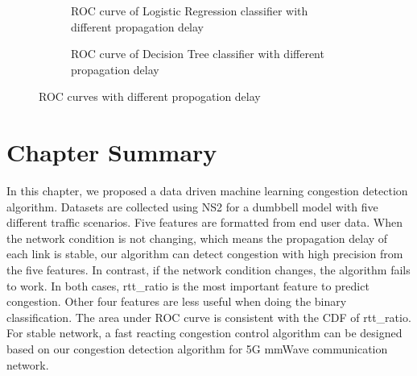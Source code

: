 \begin{figure}[!htb]\centering
\begin{subfigure}{0.49\textwidth}
\caption{ROC curve of Logistic Regression classifier with different propagation delay}
\label{LRROCDiff}
\end{subfigure}
\begin{subfigure}{0.49\textwidth}
\caption{ROC curve of Decision Tree classifier with different propagation delay}
\label{DTROCDiff}
\end{subfigure}
\caption{ROC curves with different propogation delay}
\label{fig:roc2}
\end{figure}




\section{Chapter Summary}
\label{Conclusions and Future Work}
In this chapter, we proposed a data driven machine learning congestion detection algorithm. Datasets are collected using NS2 for a dumbbell model with five different traffic scenarios. Five features are formatted from end user data. When the network condition is not changing, which means the propagation delay of each link is stable, our algorithm can detect congestion with high precision from the five features. In contrast, if the network condition changes, the algorithm fails to work. In both cases, rtt\_ratio is the most important feature to predict congestion. Other four features are less useful when doing the binary classification. The area under ROC curve is consistent with the CDF of rtt\_ratio. For stable network, a fast reacting congestion control algorithm can be designed based on our congestion detection algorithm for 5G mmWave communication network.
